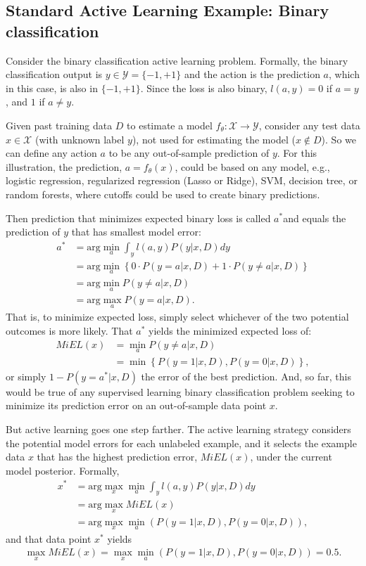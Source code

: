 \documentclass[a4paper,12pt]{article}
\begin{document}
\subsection{Standard Active Learning Example: Binary classification}

Consider the binary classification active learning problem. Formally, the binary classification output is $y \in \mathcal{Y} = \{-1,+1\}$ and the action is the prediction $a$, which in this case, is also in $\{-1,+1\}$. Since the loss is also binary, $l(a,y)=0$ if $a=y$, and $1$ if $a \neq y$. 

Given past training data $D$ to estimate a model $f_\theta: \mathcal{X} \to \mathcal{Y}$, consider any test data $x \in \mathcal{X}$ (with unknown label $y$), not used for estimating the model ($x \notin D$). So we can define any action $a$ to be any out-of-sample prediction of $y$. For this illustration, the prediction, $a=f_\theta(x)$, could be based on any model, e.g., logistic regression, regularized regression (Lasso or Ridge), SVM, decision tree, or random forests, where cutoffs could be used to create binary predictions. 

Then prediction that minimizes expected binary loss is called $a^{*}$and equals the prediction of $y$ that has smallest model error:
\begin{align}
a^{*} &= \text{arg} \min_{a} \int_y l(a,y) P(y|x,D) dy  \\
& = \text{arg} \min_{a} \left\{ 0 \cdot P(y=a|x,D) + 1 \cdot P(y \neq a|x,D) \right\}  \\
&= \text{arg} \min_{a} P(y \neq a|x,D) \\
&= \text{arg} \max_{a} P(y = a|x,D) .
\end{align}
That is, to minimize expected loss, simply select whichever of the two potential outcomes is more likely. That $a^{*}$ yields the minimized expected loss of:
\begin{align}
 MiEL(x) &= \min_{a} P(y \neq a|x,D) \\
 &= \min \left\{ P(y=1|x,D), P(y=0|x,D) \right\},
\end{align}
or simply $1 - P(y = a^{*}|x,D)$ the error of the best prediction. And, so far, this would be true of any supervised learning binary classification problem seeking to minimize its prediction error on an out-of-sample data point $x$.

But active learning goes one step farther. The active learning strategy considers the potential model errors for each unlabeled example, and it selects the example data $x$ that has the highest prediction error, $MiEL(x)$, under the current model posterior. Formally,
\begin{align}
x^{*}  &= \text{arg} \max_{x} \min_{a} \int_y l(a,y) P(y|x,D) dy \\
&= \text{arg} \max_{x} MiEL(x) \\
& =  \text{arg} \max_{x} \min_{a} \left( P(y=1|x,D), P(y=0|x,D) \right),
\end{align}
and that data point $x^{*}$ yields
\begin{align}
\max_{x} MiEL(x) = \max_{x} \min_{a} \left( P(y=1|x,D), P(y=0|x,D) \right) = 0.5 .
\end{align}
\end{document}
